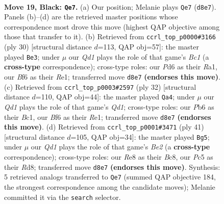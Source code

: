 \documentclass[11pt]{article}
\begin{document}
\clearpage

\begin{figure}[p]\centering
\begin{subfigure}{0.46\textwidth}\centering
\resizebox{\linewidth}{!}{%
\newchessgame
\chessboard[
  setfen={rn1qr3/p2n1pkP/1p1p1b2/2pP2p1/P3P1P1/1PNQ4/4N3/R1B1K2R b KQ - 0 19},
  showmover=false,
  pgfstyle=straightmove, color=movearrow, markmove={d8-e7}
]}
\caption{}
\end{subfigure}\hfill
\begin{subfigure}{0.46\textwidth}\centering
\resizebox{\linewidth}{!}{%
\newchessgame
\chessboard[
  setfen={r3r1k1/pp3p1p/1q3bp1/2np4/3Nn3/2P2N1P/PPQ2PP1/R1B1R1K1 w - - 3 16},
  showmover=false,
  pgfstyle=straightmove, color=movearrow, markmove={c1-e3}
]}
\caption{}
\end{subfigure}
\\[4pt]
\begin{subfigure}{0.46\textwidth}\centering
\resizebox{\linewidth}{!}{%
\newchessgame
\chessboard[
  setfen={r3r1k1/1pq1nppp/p1n5/P2p1b2/3P4/2P2N2/5PPP/R1BQRBK1 w - - 1 17},
  showmover=false,
  pgfstyle=straightmove, color=movearrow, markmove={d1-a4}
]}
\caption{}
\end{subfigure}\hfill
\begin{subfigure}{0.46\textwidth}\centering
\resizebox{\linewidth}{!}{%
\newchessgame
\chessboard[
  setfen={2br2k1/2q1bpp1/np1np2p/4N3/1pPP4/3N2P1/1B2QPBP/2R3K1 b - - 1 21},
  showmover=false,
  pgfstyle=straightmove, color=movearrow, markmove={e7-g5}
]}
\caption{}
\end{subfigure}
\caption{\textbf{Move 19, Black: \texttt{Qe7}.} (a) Our position; Melanie plays \texttt{Qe7} (\texttt{d8e7}). Panels (b)--(d) are the retrieved master positions whose correspondence most drove this move (highest QAP objective among those that transfer to it). (b) Retrieved from \texttt{ccrl\_top\_p0000\#3166} (ply 30) [structural distance $d$=113, QAP obj=57]: the master played \texttt{Be3}; under $\mu$ our \emph{Qd1} plays the role of that game's \emph{Bc1} (a \textbf{cross-type} correspondence); cross-type roles: our \emph{P}d6 as their \emph{R}a1, our \emph{B}f6 as their \emph{R}e1; transferred move \texttt{d8e7} \textbf{(endorses this move)}. (c) Retrieved from \texttt{ccrl\_top\_p0003\#2597} (ply 32) [structural distance $d$=110, QAP obj=44]: the master played \texttt{Qa4}; under $\mu$ our \emph{Qd1} plays the role of that game's \emph{Qd1}; cross-type roles: our \emph{P}b6 as their \emph{B}c1, our \emph{B}f6 as their \emph{R}e1; transferred move \texttt{d8e7} \textbf{(endorses this move)}. (d) Retrieved from \texttt{ccrl\_top\_p0001\#3471} (ply 41) [structural distance $d$=105, QAP obj=34]: the master played \texttt{Bg5}; under $\mu$ our \emph{Qd1} plays the role of that game's \emph{Be2} (a \textbf{cross-type} correspondence); cross-type roles: our \emph{R}e8 as their \emph{B}c8, our \emph{P}c5 as their \emph{R}d8; transferred move \texttt{d8e7} \textbf{(endorses this move)}. Synthesis: 5 retrieved analogs transferred to \texttt{Qe7} (summed QAP objective 184, the strongest correspondence among the candidate moves); Melanie committed it via the \texttt{search} selector.}
\label{fig:thought-m37}
\end{figure}
\end{document}
